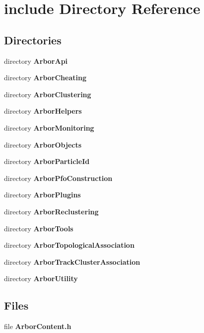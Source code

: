\section{include Directory Reference}
\label{dir_d44c64559bbebec7f509842c48db8b23}
\subsection*{Directories}
\begin{DoxyCompactItemize}
\item 
directory {\bf Arbor\+Api}
\item 
directory {\bf Arbor\+Cheating}
\item 
directory {\bf Arbor\+Clustering}
\item 
directory {\bf Arbor\+Helpers}
\item 
directory {\bf Arbor\+Monitoring}
\item 
directory {\bf Arbor\+Objects}
\item 
directory {\bf Arbor\+Particle\+Id}
\item 
directory {\bf Arbor\+Pfo\+Construction}
\item 
directory {\bf Arbor\+Plugins}
\item 
directory {\bf Arbor\+Reclustering}
\item 
directory {\bf Arbor\+Tools}
\item 
directory {\bf Arbor\+Topological\+Association}
\item 
directory {\bf Arbor\+Track\+Cluster\+Association}
\item 
directory {\bf Arbor\+Utility}
\end{DoxyCompactItemize}
\subsection*{Files}
\begin{DoxyCompactItemize}
\item 
file {\bf Arbor\+Content.\+h}
\end{DoxyCompactItemize}
